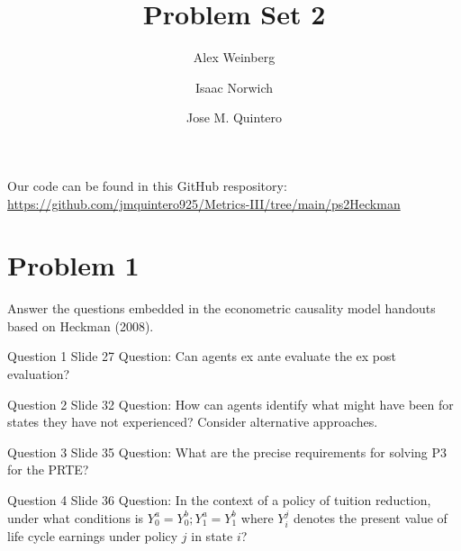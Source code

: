 \documentclass{article}
\title{Problem Set 2}
\author{Alex Weinberg \and Isaac Norwich \and Jose M. Quintero}
\begin{document}
\maketitle

\begin{comment}
Q3 - 3 parts - no solutions - Jose
Q4 - 1 part  - no solutions - Alex
Q5 - 1 part  - no solutions - Jose
Q8 - 5 parts - no solutions - Isaac

Q1 - 7 parts - solutions - Isaac & Jose
Q2 - 4 parts - solutions - Jose
Q6 - 1 part  - solutions - Alex
Q7 - 3 parts - solutions - Alex

Parts:
Isaac - 5
Alex
Jose

Total of 21 parts and 2 other questions

\end{comment}


Our code can be found in this GitHub respository: \url{https://github.com/jmquintero925/Metrics-III/tree/main/ps2Heckman}


\section*{Problem 1}
Answer the questions embedded in the econometric causality model handouts based on Heckman (2008).

\begin{problem}{Question 1 Slide 27}
Question: Can agents ex ante evaluate the ex post evaluation?
\end{problem}
\begin{solution}
\end{solution}


\begin{problem}{Question 2 Slide 32}
Question: How can agents identify what might have been for states they have not experienced? Consider alternative approaches.
\end{problem}
\begin{solution}
\end{solution}
 
\begin{problem}{Question 3 Slide 35}
Question: What are the precise requirements for solving P3 for the PRTE?
\end{problem}
\begin{solution}
\end{solution}
 
 
\begin{problem}{Question 4 Slide 36}
Question: In the context of a policy of tuition reduction, under what conditions is $Y^a_0 = Y^b_0; Y^a_1 = Y^b_1$ where $Y_i^j$ denotes the present value of life cycle earnings under policy $j$ in state $i$?
\end{problem}
\begin{solution}
\end{solution}
\end{document}
